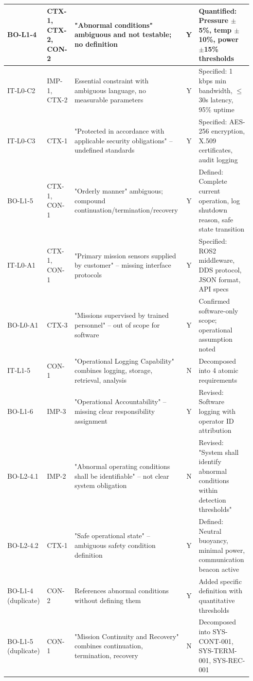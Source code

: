 \documentclass[11pt,a4paper]{article}
\begin{document}
\begin{longtable}{|>{\raggedright\arraybackslash}p{}|>{\raggedright\arraybackslash}p{}|>{\raggedright\arraybackslash}p{}|c|>{\raggedright\arraybackslash}p{}|}
BO-L1-4 & CTX-1, CTX-2, CON-2 & "Abnormal conditions" ambiguous and not testable; no definition & Y & Quantified: Pressure $\pm$5\%, temp $\pm$10\%, power $\pm$15\% thresholds \\
\hline
IT-L0-C2 & IMP-1, CTX-2 & Essential constraint with ambiguous language, no measurable parameters & Y & Specified: 1 kbps min bandwidth, $\leq$30s latency, 95\% uptime \\
\hline
IT-L0-C3 & CTX-1 & "Protected in accordance with applicable security obligations" – undefined standards & Y & Specified: AES-256 encryption, X.509 certificates, audit logging \\
\hline
BO-L1-5 & CTX-1, CON-1 & "Orderly manner" ambiguous; compound continuation/termination/recovery & Y & Defined: Complete current operation, log shutdown reason, safe state transition \\
\hline
IT-L0-A1 & CTX-1, CON-1 & "Primary mission sensors supplied by customer" – missing interface protocols & Y & Specified: ROS2 middleware, DDS protocol, JSON format, API specs \\
\hline
BO-L0-A1 & CTX-3 & "Missions supervised by trained personnel" – out of scope for software & Y & Confirmed software-only scope; operational assumption noted \\
\hline
IT-L1-5 & CON-1 & "Operational Logging Capability" combines logging, storage, retrieval, analysis & N & Decomposed into 4 atomic requirements \\
\hline
BO-L1-6 & IMP-3 & "Operational Accountability" – missing clear responsibility assignment & Y & Revised: Software logging with operator ID attribution \\
\hline
BO-L2-4.1 & IMP-2 & "Abnormal operating conditions shall be identifiable" – not clear system obligation & N & Revised: "System shall identify abnormal conditions within detection thresholds" \\
\hline
BO-L2-4.2 & CTX-1 & "Safe operational state" – ambiguous safety condition definition & Y & Defined: Neutral buoyancy, minimal power, communication beacon active \\
\hline
BO-L1-4 (duplicate) & CON-2 & References abnormal conditions without defining them & Y & Added specific definition with quantitative thresholds \\
\hline
BO-L1-5 (duplicate) & CON-1 & "Mission Continuity and Recovery" combines continuation, termination, recovery & N & Decomposed into SYS-CONT-001, SYS-TERM-001, SYS-REC-001 \\
\hline
\end{longtable}
\end{document}
